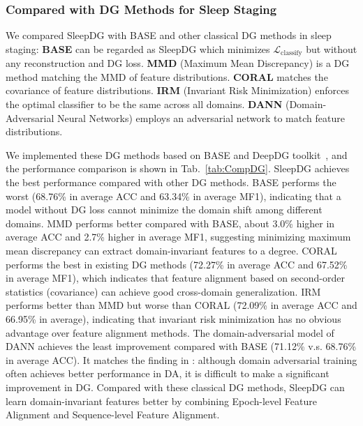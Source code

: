 \documentclass[letterpaper]{article} %
\begin{document}
	
	\subsubsection{Compared with DG Methods for Sleep Staging}
	\label{sec:dg}
	
	
	We compared SleepDG with BASE and other classical DG methods in sleep staging:
	\textbf{BASE} can be regarded as SleepDG which minimizes $\mathcal L_{\mathrm{classify}}$ but without any reconstruction and DG loss.
	\textbf{MMD} (Maximum Mean Discrepancy) \citep{tzeng2014deep, li2018domain} is a DG method matching the MMD of feature distributions.
	\textbf{CORAL} \citep{sun2016deep} matches the covariance of feature distributions.
	\textbf{IRM} (Invariant Risk Minimization) \citep{Arjovsky2019InvariantRM} enforces the optimal classifier to be the same across all domains.
	\textbf{DANN} (Domain-Adversarial Neural Networks) \citep{ganin2015unsupervised} employs an adversarial network to match feature distributions.
	
	We implemented these DG methods based on BASE and DeepDG toolkit~\citep{wang2022generalizing}, and the performance comparison is shown in Tab.~\ref{tab:CompDG}.
	SleepDG achieves the best performance compared with other DG methods.
	BASE performs the worst (68.76\% in average ACC and 63.34\% in average MF1), indicating that a model without DG loss cannot minimize the domain shift among different domains.
	MMD performs better compared with BASE, about 3.0\% higher in average ACC and 2.7\% higher in average MF1, suggesting minimizing maximum mean discrepancy can extract domain-invariant features to a degree.
	CORAL performs the best in existing DG methods (72.27\% in average ACC and 67.52\% in average MF1), which indicates that feature alignment based on second-order statistics (covariance) can achieve good cross-domain generalization.
	IRM performs better than MMD but worse than CORAL (72.09\% in average ACC and 66.95\% in average), indicating that invariant risk minimization has no obvious advantage over feature alignment methods.
	The domain-adversarial model of DANN achieves the least improvement compared with BASE (71.12\% v.s. 68.76\% in average ACC).
	It matches the finding in \citet{wang2022generalizing}: although domain adversarial training often achieves better performance in DA, it is difficult to make a significant improvement in DG.
	Compared with these classical DG methods, SleepDG can learn domain-invariant features better by combining Epoch-level Feature Alignment and Sequence-level Feature Alignment.
	
\end{document}
